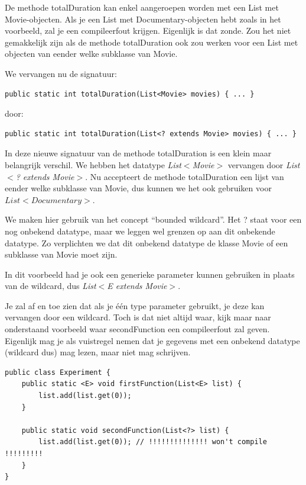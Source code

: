 De methode totalDuration kan enkel aangeroepen worden met een List met Movie-objecten. Als je een List met Documentary-objecten hebt zoals in het voorbeeld, zal je een compileerfout krijgen. Eigenlijk is dat zonde. Zou het niet gemakkelijk zijn als de methode totalDuration ook zou werken voor een List met objecten van eender welke subklasse van Movie.

We vervangen nu de signatuur:
\begin{lstlisting}
public static int totalDuration(List<Movie> movies) { ... }
\end{lstlisting}

door: 

\begin{lstlisting}
public static int totalDuration(List<? extends Movie> movies) { ... }
\end{lstlisting}

In deze nieuwe signatuur van de methode totalDuration is een klein maar belangrijk verschil. We hebben het datatype \textit{List$<$Movie$>$} vervangen door \textit{List$<$? extends Movie$>$}. Nu accepteert de methode totalDuration een lijst van eender welke subklasse van Movie, dus kunnen we het ook gebruiken voor $List<Documentary>$. 

We maken hier gebruik van het concept ``bounded wildcard''. Het ? staat voor een nog onbekend datatype, maar we leggen wel grenzen op aan dit onbekende datatype. Zo verplichten we dat dit onbekend datatype de klasse Movie of een subklasse van Movie moet zijn.

In dit voorbeeld had je ook een generieke parameter kunnen gebruiken in plaats van de wildcard, dus \textit{List$<$E extends Movie$>$}.

Je zal af en toe zien dat als  je \'e\'en type parameter gebruikt, je deze kan vervangen door een wildcard. Toch is dat niet altijd waar, kijk maar naar onderstaand voorbeeld waar secondFunction een compileerfout zal geven.
Eigenlijk mag je als vuistregel nemen dat je gegevens met een onbekend datatype (wildcard dus) mag lezen, maar niet mag schrijven.

\begin{lstlisting}
public class Experiment {
    public static <E> void firstFunction(List<E> list) {
        list.add(list.get(0));
    }

    public static void secondFunction(List<?> list) {
        list.add(list.get(0)); // !!!!!!!!!!!!!! won't compile !!!!!!!!!
    }
}
\end{lstlisting}

